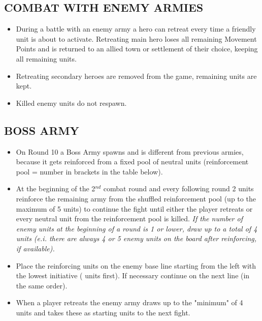 \subsection*{\MakeUppercase{Combat with enemy armies}}

\begin{itemize}
    \item During a battle with an enemy army a hero can retreat every time a friendly unit is about to 
    activate. Retreating main hero loses all remaining Movement Points and is returned to an
    allied town or settlement of their choice, keeping all remaining units.
    \item Retreating secondary heroes are removed from the game, remaining units are kept. 
    \item Killed enemy units do not respawn. 
\end{itemize}

\subsection*{\MakeUppercase{Boss army}}

\begin{itemize}
    \item On Round 10 a Boss Army spawns and is different from previous armies, because it gets reinforced 
    from a fixed pool of neutral units (reinforcement pool = number in brackets in the table below).
    \item At the beginning of the 2$^{nd}$ combat round and every following round 2 units reinforce the
    remaining army from the shuffled reinforcement pool (up to the maximum of 5 units) to
    continue the fight until either the player retreats or every neutral unit from the reinforcement
    pool is killed. \textit{If the number of enemy units at the beginning of a round is 1 or lower, draw up to 
    a total of 4 units (e.i. there are always 4 or 5 enemy units on the board after reinforcing, if available).}
    \item Place the reinforcing units on the enemy base line starting from the left with the lowest initiative
    ( units first). If necessary continue on the next line (in the same order).
    \item When a player retreats the enemy army draws up to the "minimum" of 4 units and takes these
    as starting units to the next fight. 
\end{itemize}


